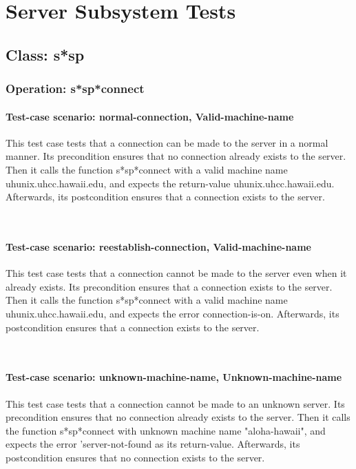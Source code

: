 \chapter {Server Subsystem Tests}

\section {Class: s*sp}
\subsection {Operation: s*sp*connect}
\subsubsection {Test-case scenario: normal-connection, Valid-machine-name}


This test case tests that a connection can be made to the server in a normal manner.
Its precondition ensures that no connection already exists to the server.
Then it calls the function s*sp*connect  with a valid machine name uhunix.uhcc.hawaii.edu, and expects the return-value uhunix.uhcc.hawaii.edu.
Afterwards, its postcondition ensures that a connection exists to the server.




\
\subsubsection {Test-case scenario: reestablish-connection, Valid-machine-name}


This test case tests that a connection cannot be made to the server even when it already exists.
Its precondition ensures that a connection exists to the server.
Then it calls the function s*sp*connect  with a valid machine name uhunix.uhcc.hawaii.edu, and expects the error connection-is-on.
Afterwards, its postcondition ensures that a connection exists to the server.




\
\subsubsection {Test-case scenario: unknown-machine-name, Unknown-machine-name}


This test case tests that a connection cannot be made to an unknown server.
Its precondition ensures that no connection already exists to the server.
Then it calls the function s*sp*connect  with unknown machine name "aloha-hawaii", and expects the error 'server-not-found as its return-value.
Afterwards, its postcondition ensures that no connection exists to the server.




